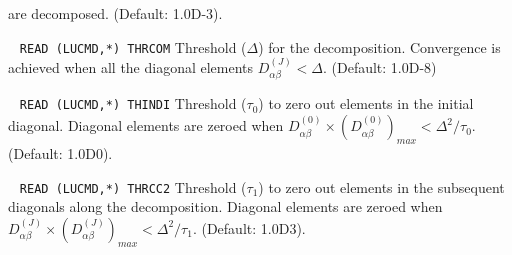 \begin{description}
\begin{center}
        \end{center}
        are decomposed. (Default: 1.0D-3).
%
\item[\Key{THRCOM}] \verb| |\newline
\verb|READ (LUCMD,*) THRCOM|\newline
        Threshold ($\Delta$) for the decomposition. Convergence is achieved 
        when all the diagonal elements $D^{(J)}_{\alpha \beta} < \Delta$.
        (Default: 1.0D-8)
%
\item[\Key{THINDI}] \verb| |\newline
\verb|READ (LUCMD,*) THINDI|\newline
       Threshold ($\tau_0$) to zero out elements in the initial diagonal. 
        Diagonal elements are zeroed when 
       $D^{(0)}_{\alpha \beta} \times (D^{(0)}_{\alpha \beta})_{max} < \Delta^2/\tau_0$.
        (Default: 1.0D0).
%
\item[\Key{THSUDI}] \verb| |\newline
\verb|READ (LUCMD,*) THRCC2|\newline
       Threshold ($\tau_1$) to zero out elements in the subsequent diagonals along 
       the decomposition. Diagonal elements are zeroed when 
       $D^{(J)}_{\alpha \beta} \times (D^{(J)}_{\alpha \beta})_{max} < \Delta^2/\tau_1$.
        (Default: 1.0D3).
%
\end{description}
